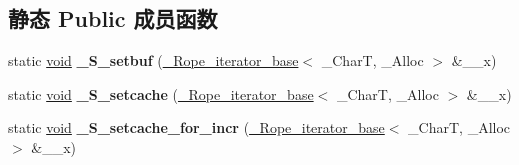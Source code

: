 \subsection*{静态 Public 成员函数}
\begin{DoxyCompactItemize}
\item 
\mbox{\label{class___rope__iterator__base_a2e56d47018700c6244a01d81dfe3dcb8}} 
static \hyperlink{interfacevoid}{void} {\bfseries \+\_\+\+S\+\_\+setbuf} (\hyperlink{class___rope__iterator__base}{\+\_\+\+Rope\+\_\+iterator\+\_\+base}$<$ \+\_\+\+CharT, \+\_\+\+Alloc $>$ \&\+\_\+\+\_\+x)
\item 
\mbox{\label{class___rope__iterator__base_a2c08b1658e12e4c94c1bbcd1ba627e1e}} 
static \hyperlink{interfacevoid}{void} {\bfseries \+\_\+\+S\+\_\+setcache} (\hyperlink{class___rope__iterator__base}{\+\_\+\+Rope\+\_\+iterator\+\_\+base}$<$ \+\_\+\+CharT, \+\_\+\+Alloc $>$ \&\+\_\+\+\_\+x)
\item 
\mbox{\label{class___rope__iterator__base_abb43c60bf5babedeb7db359ed42b95e7}} 
static \hyperlink{interfacevoid}{void} {\bfseries \+\_\+\+S\+\_\+setcache\+\_\+for\+\_\+incr} (\hyperlink{class___rope__iterator__base}{\+\_\+\+Rope\+\_\+iterator\+\_\+base}$<$ \+\_\+\+CharT, \+\_\+\+Alloc $>$ \&\+\_\+\+\_\+x)
\end{DoxyCompactItemize}
